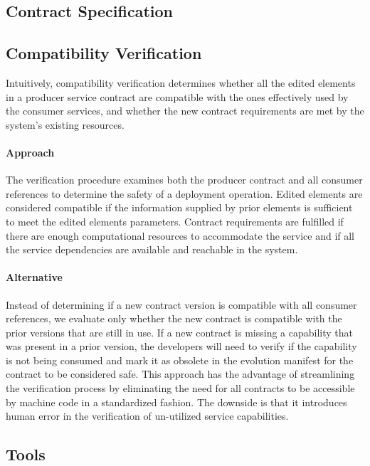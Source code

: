 \subsection{Contract Specification} %
\label{sec:contract_specification}



\subsection{Compatibility Verification} %
\label{sec:compatibility_verification}

Intuitively, compatibility verification determines whether
all the edited elements in a producer service contract are compatible with the ones effectively
used by the consumer services, and whether the new contract requirements are met
by the system’s existing resources.

\paragraph{Approach}
The verification procedure examines both the producer contract and all consumer references to determine the safety of a deployment operation.
Edited elements are considered compatible if the information supplied by prior elements is sufficient to meet the edited elements parameters.
Contract requirements are fulfilled if there are enough computational resources to accommodate the service and if all the
service dependencies are available and reachable in the system.

\paragraph{Alternative}
Instead of determining if a new contract version is compatible with all consumer references,
we evaluate only whether the new contract is compatible with the prior versions that are still in use.
If a new contract is missing a capability that was present in a prior version,
the developers will need to verify if the capability is not being consumed
and mark it as obsolete in the evolution manifest for the contract to be considered safe.
This approach has the advantage of streamlining the verification process by eliminating the
need for all contracts to be accessible by machine code in a standardized fashion.
The downside is that it introduces human error in the verification of un-utilized service capabilities.

\subsection{Tools} %
\label{sec:tools}


